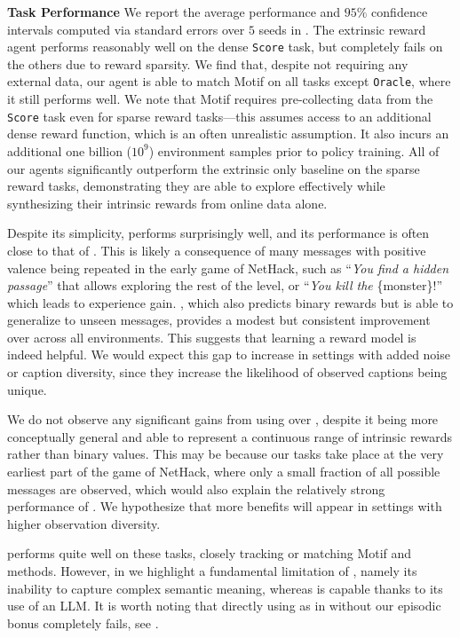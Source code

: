 \textbf{Task Performance}  We report the average performance
and $95\%$ confidence intervals computed via standard errors over $5$ seeds in .
%
The extrinsic reward agent performs reasonably well on the dense \texttt{Score} task, but completely fails on the others due to reward sparsity. We find that, despite not requiring any external data, our \onicls agent is able to match Motif on all tasks except \texttt{Oracle}, where it still performs well. 
We note that Motif requires pre-collecting data from the \texttt{Score} task even for sparse reward tasks---this assumes access to an additional dense reward function, which is an often unrealistic assumption. It also incurs an additional one billion ($10^9$) environment samples prior to policy training.
All of our agents significantly outperform the extrinsic only baseline on the sparse reward tasks, demonstrating they are able to explore effectively while synthesizing their intrinsic rewards from online data alone. 

%

Despite its simplicity, \oniretrieval performs surprisingly well, and its performance is often close to that of \onicls. This is likely a consequence of many messages with positive valence being repeated in the early game of NetHack, such as ``\emph{You find a hidden passage}'' that allows exploring the rest of the level, or ``\emph{You kill the} \{monster\}!'' which leads to experience gain. \onicls, which also predicts binary rewards but is able to generalize to unseen messages, provides a modest but consistent improvement over \oniretrieval across all environments. This suggests that learning a reward model is indeed helpful. We would expect this gap to increase in settings with added noise or caption diversity, since they increase the likelihood of observed captions being unique. 

We do not observe any significant gains from using \oniranking over \onicls, despite it being more conceptually general and able to represent a continuous range of intrinsic rewards rather than binary values. This may be because our tasks take place at the very earliest part of the game of NetHack, where only a small fraction of all possible messages are observed, which would also explain the relatively strong performance of \oniretrieval. We hypothesize that more benefits will appear in settings with higher observation diversity.%
%
%
%

%
\ellmbow performs quite well on these tasks, closely tracking or matching Motif and \oni methods. However, in  we highlight a fundamental limitation of \ellmbow, namely its inability to capture complex semantic meaning, whereas \oni is capable thanks to its use of an LLM. It is worth noting that directly using \ellmbow as in \citet{du2023guiding} without our episodic bonus completely fails, see . 
%


